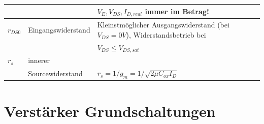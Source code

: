 \begin{tabular}{| l | l | l |}
                    &                       & $V_E, V_{DS}, I_{D,real}$ immer im Betrag! \\
    \hline
    $r_{DS0}$       & Eingangswiderstand    & Kleinstmöglicher Ausgangswiderstand (bei $V_{DS} = 0V$), Widerstandsbetrieb bei\\
                    &                       & $V_{DS} \leq V_{DS,sat}$ \\
    \hline
    $r_s$           & innerer                & \\
                    & Sourcewiderstand       & $r_s = 1/g_m = 1 / \sqrt{2\mu C_{ox} I_D}$\\
    \hline
    \end{tabular}
\section{Verstärker Grundschaltungen }
\renewcommand{\arraystretch}{1.3}
